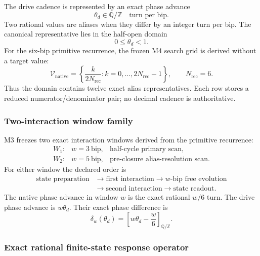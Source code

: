The drive cadence is represented by an exact phase advance
\[
\theta_d\in\mathbb{Q}/\mathbb{Z}
\quad\text{turn per bip}.
\]
Two rational values are aliases when they differ by an integer turn per bip.
The canonical representative lies in the half-open domain
\[
0\le \theta_d<1.
\]
For the six-bip primitive recurrence, the frozen M4 search grid is derived
without a target value:
\[
\mathcal V_{\mathrm{native}}
=
\left\{
\frac{k}{2N_{\mathrm{rec}}}:k=0,\ldots,2N_{\mathrm{rec}}-1
\right\},
\qquad N_{\mathrm{rec}}=6.
\]
Thus the domain contains twelve exact alias representatives. Each row stores a
reduced numerator/denominator pair; no decimal cadence is authoritative.

\subsubsection{Two-interaction window family}

M3 freezes two exact interaction windows derived from the primitive recurrence:
\[
\begin{array}{lll}
W_{1}:&w=3\ \mathrm{bip},&\text{half-cycle primary scan},\\
W_{2}:&w=5\ \mathrm{bip},&\text{pre-closure alias-resolution scan}.
\end{array}
\]
For either window the declared order is
\[
\begin{aligned}
\text{state preparation}&\longrightarrow\text{first interaction}
\longrightarrow w\text{-bip free evolution}\\
&\longrightarrow\text{second interaction}\longrightarrow\text{state readout}.
\end{aligned}
\]
The native phase advance in window $w$ is the exact rational $w/6$ turn.  The
drive phase advance is $w\theta_d$.  Their exact phase difference is
\[
\delta_w(\theta_d)
=
\left[w\theta_d-\frac{w}{6}\right]_{\mathbb{Q}/\mathbb{Z}}.
\]

\subsubsection{Exact rational finite-state response operator}

